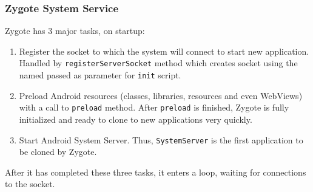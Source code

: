 \subsubsection*{Zygote System Service}

Zygote has 3 major tasks, on startup:
\begin{enumerate}
    \item Register the socket to which the system will connect to start new application. Handled by \texttt{registerServerSocket} method which creates socket using the named passed as parameter for \texttt{init} script.
    \item Preload Android resources (classes, libraries, resources and even WebViews) with a call to \texttt{preload} method. After \texttt{preload} is finished, Zygote is fully initialized and ready to clone to new applications very quickly.
    \item Start Android System Server. Thus, \texttt{SystemServer} is the first application to be cloned by Zygote.
\end{enumerate}
After it has completed these three tasks, it enters a loop, waiting for connections to the socket.

